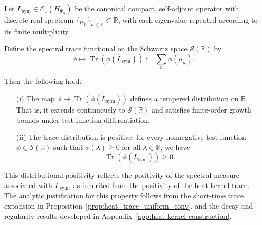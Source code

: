 \begin{lemma}
\label{lem:trace_distribution_positivity}
Let \( L_{\mathrm{sym}} \in \mathcal{C}_1(H_{\Psi_\alpha}) \) be the canonical compact, self-adjoint operator with discrete real spectrum \( \{ \mu_n \}_{n \in \mathbb{Z}} \subset \mathbb{R} \), with each eigenvalue repeated according to its finite multiplicity.

Define the spectral trace functional on the Schwartz space \( \mathcal{S}(\mathbb{R}) \) by
\[
\phi \mapsto \operatorname{Tr}(\phi(L_{\mathrm{sym}})) := \sum_n \phi(\mu_n).
\]

Then the following hold:
\begin{enumerate}
  \item[\normalfont(i)] The map \( \phi \mapsto \operatorname{Tr}(\phi(L_{\mathrm{sym}})) \) defines a tempered distribution on \( \mathbb{R} \). That is, it extends continuously to \( \mathcal{S}(\mathbb{R}) \) and satisfies finite-order growth bounds under test function differentiation.

  \item[\normalfont(ii)] The trace distribution is positive: for every nonnegative test function \( \phi \in \mathcal{S}(\mathbb{R}) \) such that \( \phi(\lambda) \ge 0 \) for all \( \lambda \in \mathbb{R} \), we have
  \[
  \operatorname{Tr}(\phi(L_{\mathrm{sym}})) \ge 0.
  \]
\end{enumerate}

\medskip
\noindent
This distributional positivity reflects the positivity of the spectral measure associated with \( L_{\mathrm{sym}} \), as inherited from the positivity of the heat kernel trace. The analytic justification for this property follows from the short-time trace expansion in Proposition~\ref{prop:heat_trace_uniform_conv}, and the decay and regularity results developed in Appendix~\ref{app:heat-kernel-construction}.
\end{lemma}
